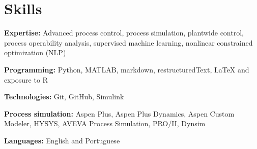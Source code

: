 \documentclass[letterpaper,11pt]{article}
\newcommand{\resumeSubHeadingListStart}{\begin{itemize}[leftmargin=0.15in, label={}]}
\newcommand{\resumeSubHeadingListEnd}{\end{itemize}}
\begin{document}
\section{Skills}
  \vspace{0pt}
  \resumeSubHeadingListStart
    \small{\item{

        \textbf{Expertise:}{ Advanced process control, process simulation, plantwide control, process operability analysis, supervised machine learning, nonlinear constrained optimization (NLP)} \\ \vspace{3pt}

        \textbf{Programming:}{ Python, MATLAB, markdown, restructuredText, LaTeX and exposure to R} \\ \vspace{3pt}
        
        \textbf{Technologies:}{ Git, GitHub, Simulink} \\ \vspace{3pt}

        \textbf{Process simulation:}{ Aspen Plus, Aspen Plus Dynamics, Aspen Custom Modeler, HYSYS, AVEVA Process Simulation, PRO/II, Dynsim} \\ \vspace{3pt}

        \textbf{Languages:}{ English and Portuguese}
        
    }}
  \resumeSubHeadingListEnd
\end{document}
